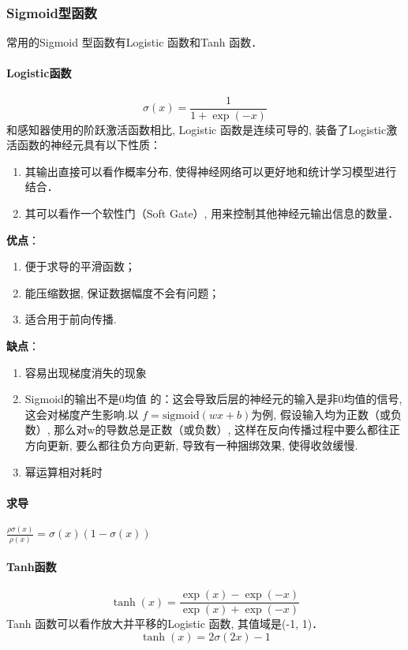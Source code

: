 \documentclass[a4paper]{article}
\begin{document}
\subsubsection{Sigmoid型函数}
常用的Sigmoid 型函数有Logistic 函数和Tanh 函数．
\paragraph{Logistic函数}
$$\sigma(x)=\frac{1}{1+\exp(-x)}$$
和感知器使用的阶跃激活函数相比, Logistic 函数是连续可导的, 
装备了Logistic激活函数的神经元具有以下性质：
\begin{enumerate}
    \renewcommand{\labelenumi}{(\theenumi)}
 \item 其输出直接可以看作概率分布, 使得神经网络可以更好地和统计学习模型进行结合． 
 \item 其可以看作一个软性门（Soft Gate）, 用来控制其他神经元输出信息的数量．
\end{enumerate}

\textbf{优点}：
\begin{enumerate}
    \renewcommand{\labelenumi}{(\theenumi)}
\item 便于求导的平滑函数；
\item 能压缩数据, 保证数据幅度不会有问题；
\item 适合用于前向传播.
\end{enumerate}

\textbf{缺点}：
\begin{enumerate}
    \renewcommand{\labelenumi}{(\theenumi)}
    \item 容易出现梯度消失的现象 
   \item Sigmoid的输出不是0均值 的：这会导致后层的神经元的输入是非0均值的信号, 这会对梯度产生影响.以 $f=\mathrm{sigmoid}(wx+b)$为例,  假设输入均为正数（或负数）, 那么对w的导数总是正数（或负数）, 这样在反向传播过程中要么都往正方向更新, 要么都往负方向更新, 导致有一种捆绑效果, 使得收敛缓慢.
    \item 幂运算相对耗时 
\end{enumerate}
\paragraph{求导}
$ \frac{\rho \sigma(x)}{\rho(x)}=\sigma(x)(1-\sigma(x))$
​	 
\paragraph{Tanh函数}
$$\tanh(x)=\frac{\exp(x)-\exp(-x)}{\exp(x)+\exp(-x)} $$
Tanh 函数可以看作放大并平移的Logistic 函数, 其值域是(-1,  1)．
$$\tanh(x) = 2 \sigma (2x)-1$$
\end{document}
